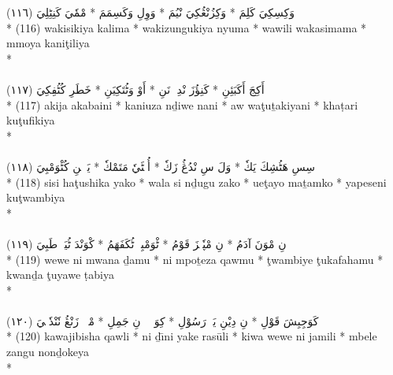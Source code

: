 \documentclass[a4paper, 12pt]{report}
\begin{document}
\begin{center}
\textarabic{(١١٦) \textcolor{mygreen}{وَكِسِكِيَ كَلِمَ  * وَكِزُنْڠُكِيَ نْيُمَ  * وَوِلِ وَكَسِمَمَ  * مْمٗيَ كَنِٹِلِيَ }} \\* 
(116) wakisikiya kalima  * wakizungukiya nyuma  * wawili wakasimama  * mmoya kaniţiliya  \\* 
 \\ 
\\[8mm] 

\textarabic{(١١٧) \textcolor{mygreen}{أَكِجَ أَكَبَئِنِ  * كَنِؤُزَ نْدِوٖ نَنِ  * أَوْ وَٹُتَكِيَنِ  * خَطَرِ كُٹُفِكِيَ }} \\* 
(117) akija akabaini  * kaniuza nḏiwe nani  * aw waţuṯakiyani  * khaṭari kuţufikiya  \\* 
 \\ 
\\[8mm] 

\textarabic{(١١٨) \textcolor{mygreen}{سِسِ هَٹُشِكَ يَكٗ  * وَلَ سِ نْدُڠُ زَكٗ  * أُئٖٹَيٗ مَتَمْكٗ  * يَپٖسٖنِ كُٹْوَمْبِيَ }} \\* 
(118) sisi haţushika yako  * wala si nḏugu zako  * ueţayo maṯamko  * yapeseni kuţwambiya  \\* 
 \\ 
\\[8mm] 

\textarabic{(١١٩) \textcolor{mygreen}{وٖوٖ نِ مْوَنَ آدَمُ  * نِ مْپٗتٖزَ قَوْمُ  * ٹْوَمْبِيٖ ٹُكَفَهَمُ  * كْوَنْدَ ٹُيَوٖ طَبِيَ }} \\* 
(119) wewe ni mwana ḏamu  * ni mpoṯeza qawmu  * ţwambiye ţukafahamu  * kwanḏa ţuyawe ṭabiya  \\* 
 \\ 
\\[8mm] 

\textarabic{(١٢٠) \textcolor{mygreen}{كَوَجِبِشَ قَوْلِ  * نِ دِيْنِ يَكٖ رَسُوْلِ  * كِوَ وٖوٖ نِ جَمِلِ  * مْبٖلٖ زَنْڠُ نٗنْدٗكٖيَ }} \\* 
(120) kawajibisha qawli  * ni ḏı̄ni yake rasūli  * kiwa wewe ni jamili  * mbele zangu nonḏokeya  \\* 
 \\ 
\\[8mm] 


\end{center}
\end{document}
